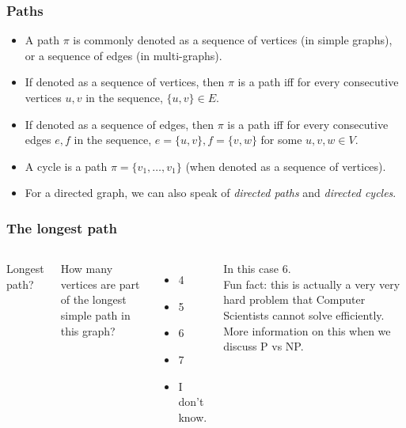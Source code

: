 \begin{frame}
	\frametitle{Paths}
		\begin{itemize}
			\item A path $\pi$ is commonly denoted as a sequence of vertices (in simple graphs), or a sequence of edges (in
				multi-graphs).
				
			\item If denoted as a sequence of vertices, then $\pi$ is a path iff for every consecutive vertices $u,v$ in the
				sequence, $\{u,v\} \in E$.
				
			\item If denoted as a sequence of edges, then $\pi$ is a path iff for every consecutive edges $e,f$ in the
				sequence, $e=\{u,v\}, f=\{v,w\}$ for some $u,v,w \in V$.
				
			\item A cycle is a path $\pi = \{v_1, \dots, v_1\}$ (when denoted as a sequence of vertices).
				
			\item For a directed graph, we can also speak of \textit{directed paths} and \textit{directed cycles}.
		\end{itemize}
\end{frame}

\begin{frame}
	\frametitle{The longest path}
	\begin{columns}[T]
			
Longest path?
		
			How many vertices are part of the longest simple path in this graph?
			\begin{itemize}
				\item 4
				\item 5 
				\item 6
				\item 7
				\item I don't know.
			\end{itemize}
		
			In this case 6. \\
			Fun fact: this is actually a \alert{very very hard problem} that Computer Scientists cannot solve efficiently. More
			information on this when we discuss P vs NP.
	\end{columns}
\end{frame}

